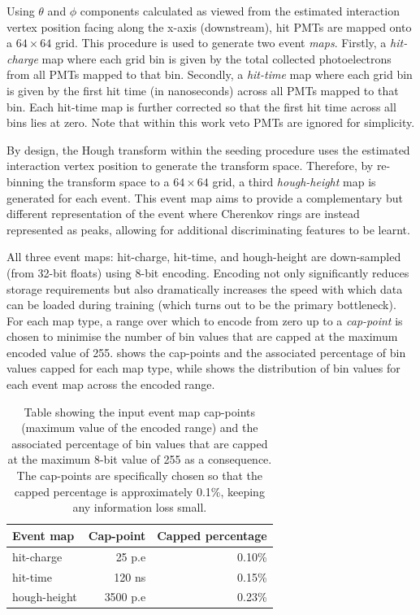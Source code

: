 Using $\theta$ and $\phi$ components calculated as viewed from the estimated interaction vertex
position facing along the x-axis (downstream), hit PMTs are mapped onto a $64 \times 64$ grid.
This procedure is used to generate two event \emph{maps}. Firstly, a \emph{hit-charge} map where
each grid bin is given by the total collected photoelectrons from all PMTs mapped to that bin.
Secondly, a \emph{hit-time} map where each grid bin is given by the first hit time (in
nanoseconds) across all PMTs mapped to that bin. Each hit-time map is further corrected so that
the first hit time across all bins lies at zero. Note that within this work veto PMTs are ignored
for simplicity.

By design, the Hough transform within the seeding procedure uses the estimated interaction vertex
position to generate the transform space. Therefore, by re-binning the transform space to a $64
\times 64$ grid, a third \emph{hough-height} map is generated for each event. This event map aims
to provide a complementary but different representation of the event where Cherenkov rings are
instead represented as peaks, allowing for additional discriminating features to be learnt.

All three event maps: hit-charge, hit-time, and hough-height are down-sampled (from 32-bit floats)
using 8-bit encoding. Encoding not only significantly reduces storage requirements but also
dramatically increases the speed with which data can be loaded during training (which turns out to
be the primary bottleneck). For each map type, a range over which to encode from zero up to a
\emph{cap-point} is chosen to minimise the number of bin values that are capped at the maximum
encoded value of 255.  shows the cap-points and the associated percentage
of bin values capped for each map type, while  shows the
distribution of bin values for each event map across the encoded range.

\begin{table}
    \begin{tabular}{lrr}
        Event map    & Cap-point & Capped percentage \\
        \midrule
        hit-charge   & 25 p.e    & 0.10\%            \\
        hit-time     & 120 ns    & 0.15\%            \\
        hough-height & 3500 p.e  & 0.23\%            \\
    \end{tabular}
    \caption[Table of input event map 8-bit cap-points and percentages]
    {Table showing the input event map cap-points (maximum value of the encoded range) and the
        associated percentage of bin values that are capped at the maximum 8-bit value of 255 as a
        consequence. The cap-points are specifically chosen so that the capped percentage is
        approximately 0.1\%, keeping any information loss small.}
    \label{tab:encoding}
\end{table}

